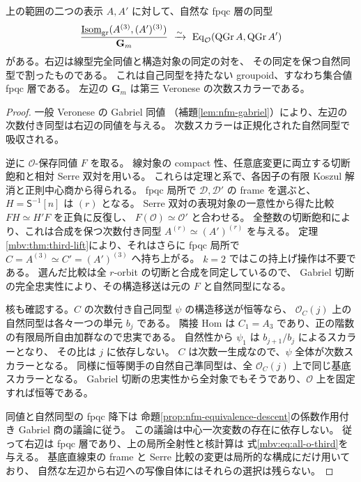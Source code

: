 \begin{theorem}
\label{mbv:thm:all-o-third}
上の範囲の二つの表示 $A,A'$ に対して、自然な fpqc 層の同型
\begin{equation}\label{mbv:eq:all-o-third}
 \frac{\underline{\operatorname{Isom}}_{\rm gr}(A^{(3)},(A')^{(3)})}
 {\mathbf G_m}
 \ \xrightarrow{\sim}\
 \operatorname{Eq}_{\mathcal O}
 (\operatorname{QGr}A,\operatorname{QGr}A')
\end{equation}
がある。右辺は線型完全同値と構造対象の同定の対を、
その同定を保つ自然同型で割ったものである。
これは自己同型を持たない groupoid、すなわち集合値 fpqc 層である。
左辺の $\mathbf G_m$ は第三 Veronese の次数スカラーである。
\end{theorem}
\begin{proof}
一般 Veronese の Gabriel 同値
（補題\ref{lem:nfm-gabriel}）により、左辺の次数付き同型は右辺の同値を与える。
次数スカラーは正規化された自然同型で吸収される。

逆に $\mathcal O$-保存同値 $F$ を取る。
線対象の compact 性、任意底変更に両立する切断飽和と相対 Serre 双対を用いる。
これらは定理と系で、各因子の有限 Koszul 解消と正則中心商から得られる。
fpqc 局所で $\mathcal D,\mathcal D'$ の frame を選ぶと、
$H=\mathsf S^{-1}[n]$ は $(r)$ となる。
Serre 双対の表現対象の一意性から得た比較 $FH\simeq H'F$ を正負に反復し、
$F(\mathcal O)\simeq\mathcal O'$ と合わせる。
全整数の切断飽和により、これは合成を保つ次数付き同型
$A^{(r)}\simeq(A')^{(r)}$ を与える。
定理\ref{mbv:thm:third-lift}により、それはさらに fpqc 局所で
$C=A^{(3)}\simeq C'=(A')^{(3)}$ へ持ち上がる。
$k=2$ ではこの持上げ操作は不要である。
選んだ比較は全 $r$-orbit の切断と合成を同定しているので、
Gabriel 切断の完全忠実性により、その構造移送は元の $F$ と自然同型になる。

核も確認する。$C$ の次数付き自己同型 $\psi$ の構造移送が恒等なら、
$\mathcal O_C(j)$ 上の自然同型は各々一つの単元 $b_j$ である。
隣接 Hom は $C_1=A_3$ であり、正の階数の有限局所自由加群なので忠実である。
自然性から $\psi_1$ は $b_{j+1}/b_j$ によるスカラーとなり、
その比は $j$ に依存しない。
$C$ は次数一生成なので、$\psi$ 全体が次数スカラーとなる。
同様に恒等関手の自然自己準同型は、全 $\mathcal O_C(j)$ 上で同じ基底スカラーとなる。
Gabriel 切断の忠実性から全対象でもそうであり、$\mathcal O$ 上を固定すれば恒等である。

同値と自然同型の fpqc 降下は
命題\ref{prop:nfm-equivalence-descent}の係数作用付き Gabriel 商の議論に従う。
この議論は中心一次変数の存在に依存しない。
従って右辺は fpqc 層であり、上の局所全射性と核計算は
式\eqref{mbv:eq:all-o-third}を与える。
基底直線束の frame と Serre 比較の変更は局所的な構成にだけ用いており、
自然な左辺から右辺への写像自体にはそれらの選択は残らない。
\end{proof}

